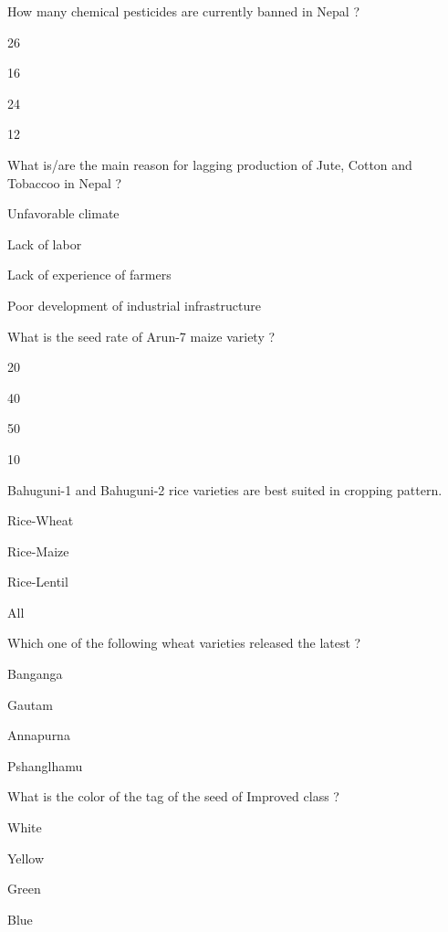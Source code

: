 \begin{questions}
\question How many chemical pesticides are currently banned in Nepal ?
\begin{items}
\item 26
\item 16
\item* 24
\item 12
\end{items}

\question What is/are the main reason for lagging production of Jute, Cotton and Tobaccoo in Nepal ?
\begin{items}
\item Unfavorable climate
\item Lack of labor
\item Lack of experience of farmers
\item* Poor development of industrial infrastructure
\end{items}

\question What is the seed rate of Arun-7 maize variety ?
\begin{items}
\item* 20
\item 40
\item 50
\item 10
\end{items}

\question Bahuguni-1 and Bahuguni-2 rice varieties are best suited in \fillin[][3cm] cropping pattern.
\begin{items}
\item Rice-Wheat
\item Rice-Maize
\item Rice-Lentil
\item* All
\end{items}

\question Which one of the following wheat varieties released the latest ?
\begin{items}
\item* Banganga
\item Gautam
\item Annapurna
\item Pshanglhamu
\end{items}

\question What is the color of the tag of the seed of Improved class ?
\begin{items}
\item White
\item* Yellow
\item Green
\item Blue
\end{items}


\end{questions}
